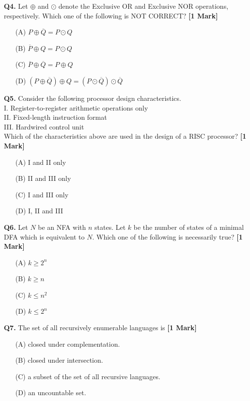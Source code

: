 \documentclass[11pt]{article}
\newcommand{\questiona}[2]{
    \noindent\textbf{Q#2.} #1 \hfill \textbf{[1 Mark]}
}
\begin{document}
\questiona{Let \( \oplus \) and \( \odot \) denote the Exclusive OR and Exclusive NOR operations, respectively. Which one of the following is NOT CORRECT?}{4}
\begin{enumerate}
    \item[(A)] \( P \oplus \overline{Q} = P \odot Q \)
    \item[(B)] \( \overline{P} \oplus Q = P \odot Q \)
    \item[(C)] \( \overline{P} \oplus \overline{Q} = P \oplus Q \)
    \item[(D)] \( (P \oplus \overline{Q}) \oplus Q = (P \odot \overline{Q}) \odot \overline{Q} \)
\end{enumerate}
\vspace{0.5cm}

\questiona{Consider the following processor design characteristics.\\
I. Register-to-register arithmetic operations only\\
II. Fixed-length instruction format\\
III. Hardwired control unit\\
Which of the characteristics above are used in the design of a RISC processor?}{5}
\begin{enumerate}
    \item[(A)] I and II only
    \item[(B)] II and III only
    \item[(C)] I and III only
    \item[(D)] I, II and III
\end{enumerate}
\vspace{0.5cm}

\questiona{Let \( N \) be an NFA with \( n \) states. Let \( k \) be the number of states of a minimal DFA which is equivalent to \( N \). Which one of the following is necessarily true?}{6}
\begin{enumerate}
    \item[(A)] \( k \geq 2^n \)
    \item[(B)] \( k \geq n \)
    \item[(C)] \( k \leq n^2 \)
    \item[(D)] \( k \leq 2^n \)
\end{enumerate}
\vspace{0.5cm}

\questiona{The set of all recursively enumerable languages is}{7}
\begin{enumerate}
    \item[(A)] closed under complementation.
    \item[(B)] closed under intersection.
    \item[(C)] a subset of the set of all recursive languages.
    \item[(D)] an uncountable set.
\end{enumerate}
\vspace{0.5cm}
\end{document}

